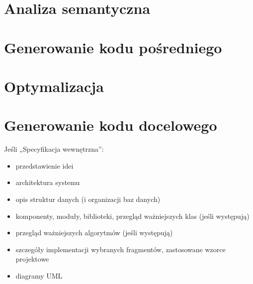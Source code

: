 \section{Analiza semantyczna}

\section{Generowanie kodu pośredniego}

\section{Optymalizacja}

\section{Generowanie kodu docelowego}

Jeśli „Specyfikacja wewnętrzna”:
\begin{itemize}
\item przedstawienie idei
\item architektura systemu
\item opis struktur danych (i organizacji baz danych)
\item komponenty, moduły, biblioteki, przegląd ważniejszych klas (jeśli występują)
\item przegląd ważniejszych algorytmów (jeśli występują)
\item szczegóły implementacji wybranych fragmentów, zastosowane wzorce projektowe
\item diagramy UML
\end{itemize}



